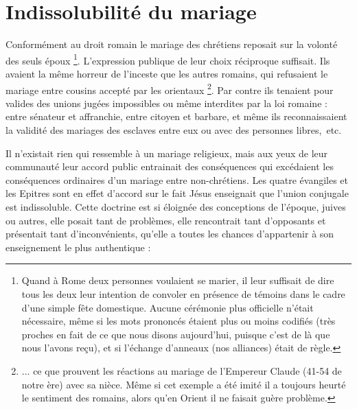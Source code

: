 \section{Indissolubilité du mariage}

 Conformément au droit romain le mariage des chrétiens reposait sur la volonté des seuls époux
\footnote{Quand à Rome deux personnes voulaient se marier, il leur suffisait de dire tous les deux leur intention de convoler en présence de témoins dans le cadre d'une simple fête domestique. Aucune cérémonie plus officielle n'était nécessaire, même si les mots prononcés étaient plus ou moins codifiés (très proches en fait de ce que nous disons aujourd'hui, puisque c'est de là que nous l'avons reçu), et si l'échange d'anneaux (nos alliances) était de règle.}. L'expression publique de leur choix réciproque suffisait. Ils avaient la même horreur de l'inceste que les autres romains, qui refusaient le mariage entre cousins accepté par les orientaux
\footnote{... ce que prouvent les réactions au mariage de l'Empereur Claude (41-54 de notre ère) avec sa nièce. Même si cet exemple a été imité il a toujours heurté le sentiment des romains, alors qu'en Orient il ne faisait guère problème.}. Par contre ils tenaient pour valides des unions jugées impossibles ou même interdites par la loi romaine : entre sénateur et affranchie, entre citoyen et barbare, et même ils reconnaissaient la validité des mariages des esclaves entre eux ou avec des personnes libres,~etc.

 Il n'existait rien qui ressemble à un mariage religieux, mais aux yeux de leur communauté leur accord public entrainait des conséquences qui excédaient les conséquences ordinaires d'un mariage entre non-chrétiens.  Les quatre évangiles et les Epitres sont en effet d'accord sur le fait Jésus enseignait que l'union conjugale est indissoluble. Cette doctrine est si éloignée des conceptions de l'époque, juives ou autres, elle posait tant de problèmes, elle rencontrait tant d'opposants et présentait tant d'inconvénients, qu'elle a toutes les chances d'appartenir à son enseignement le plus authentique :

